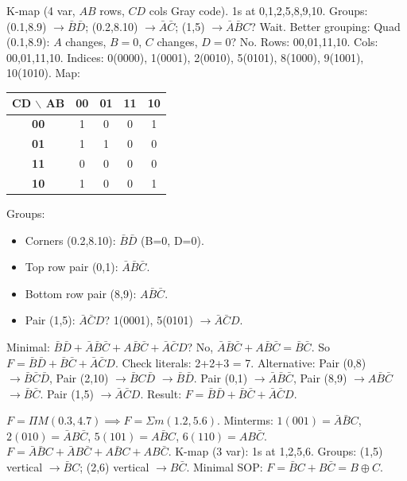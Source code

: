 \documentclass[11pt]{article}
\begin{document}
\begin{corrige}[Exercise 2]
K-map (4 var, $AB$ rows, $CD$ cols Gray code). 1s at 0,1,2,5,8,9,10.
Groups: (0.1,8.9) $\to \bar{B}\bar{D}$; (0.2,8.10) $\to \bar{A}\bar{C}$; (1,5) $\to \bar{A}\bar{B}C$? Wait.
Better grouping:
Quad (0.1,8.9): $A$ changes, $B=0$, $C$ changes, $D=0$? No.
Rows: 00,01,11,10. Cols: 00,01,11,10.
Indices: 0(0000), 1(0001), 2(0010), 5(0101), 8(1000), 9(1001), 10(1010).
Map:
\begin{center}
\begin{tabular}{|c|cccc|}
\hline
\rowcolor{popblueL} \textbf{CD $\backslash$ AB} & \textbf{00} & \textbf{01} & \textbf{11} & \textbf{10} \\
\hline
\textbf{00} & 1 & 0 & 0 & 1 \\
\textbf{01} & 1 & 1 & 0 & 0 \\
\textbf{11} & 0 & 0 & 0 & 0 \\
\textbf{10} & 1 & 0 & 0 & 1 \\
\hline
\end{tabular}
\end{center}
Groups:
\begin{itemize}
\item Corners (0.2,8.10): $\bar{B}\bar{D}$ (B=0, D=0).
\item Top row pair (0,1): $\bar{A}\bar{B}\bar{C}$.
\item Bottom row pair (8,9): $A\bar{B}\bar{C}$.
\item Pair (1,5): $\bar{A}\bar{C}D$? 1(0001), 5(0101) $\to \bar{A}\bar{C}D$.
\end{itemize}
Minimal: $\bar{B}\bar{D} + \bar{A}\bar{B}\bar{C} + A\bar{B}\bar{C} + \bar{A}\bar{C}D$? No, $\bar{A}\bar{B}\bar{C}+A\bar{B}\bar{C} = \bar{B}\bar{C}$.
So $F = \bar{B}\bar{D} + \bar{B}\bar{C} + \bar{A}\bar{C}D$.
Check literals: 2+2+3 = 7.
Alternative: Pair (0,8) $\to \bar{B}\bar{C}\bar{D}$, Pair (2,10) $\to \bar{B}C\bar{D}$ $\to \bar{B}\bar{D}$.
Pair (0,1) $\to \bar{A}\bar{B}\bar{C}$, Pair (8,9) $\to A\bar{B}\bar{C}$ $\to \bar{B}\bar{C}$.
Pair (1,5) $\to \bar{A}\bar{C}D$.
Result: $F = \bar{B}\bar{D} + \bar{B}\bar{C} + \bar{A}\bar{C}D$.
\end{corrige}

\begin{corrige}[Exercise 3]
$F=\Pi M(0.3,4.7) \implies F=\Sigma m(1.2,5.6)$.
Minterms: $1(001)=\bar{A}\bar{B}C$, $2(010)=\bar{A}B\bar{C}$, $5(101)=A\bar{B}C$, $6(110)=AB\bar{C}$.
$F=\bar{A}\bar{B}C+\bar{A}B\bar{C}+A\bar{B}C+AB\bar{C}$.
K-map (3 var): 1s at 1,2,5,6.
Groups: (1,5) vertical $\to \bar{B}C$; (2,6) vertical $\to B\bar{C}$.
Minimal SOP: $F=\bar{B}C+B\bar{C} = B\oplus C$.
\end{corrige}
\end{document}
